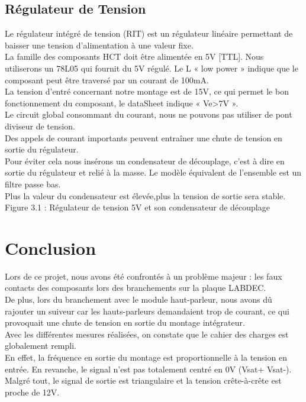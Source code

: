 {\section{Régulateur de Tension }


Le régulateur intégré de tension (RIT) est un régulateur linéaire permettant de baisser une tension d’alimentation à une valeur fixe.\\

La famille des composants HCT doit être alimentée en 5V [TTL]. Nous utiliserons un 78L05 qui fournit du 5V régulé. Le L « low power » indique que le composant peut être traversé par un courant de 100mA.\\
La tension d’entré concernant notre montage est de 15V, ce qui permet le bon fonctionnement du composant, le dataSheet indique « Ve>7V ».  \\

Le circuit global consommant du courant, nous ne pouvons pas utiliser de pont diviseur de tension.\\
 
Des appels de courant importants peuvent entraîner une chute de tension en sortie du régulateur. \\
Pour éviter cela nous insérons un condensateur de découplage, c’est à dire  en sortie du régulateur et relié à la masse. 
Le modèle équivalent de l’ensemble est un filtre passe bas.\\

Plus la valeur du condensateur est élevée,plus la tension de sortie sera stable.\\


 Figure 3.1 : Régulateur de tension 5V et son condensateur de découplage\chapter{Conclusion}

Lors de ce projet, nous avons été confrontés à un problème majeur : les faux contacts des composants lors des branchements sur la plaque LABDEC.\\

De plus, lors du branchement avec le module haut-parleur, nous avons dû rajouter un suiveur car les hauts-parleurs demandaient trop de courant, 
ce qui provoquait une chute de tension en sortie du montage intégrateur.\\

Avec les différentes mesures réalisées, on constate que le cahier des charges est globalement rempli.\\
En effet, la fréquence en sortie du montage est proportionnelle à la tension en entrée. En revanche, le signal n’est pas totalement centré en 0V (Vsat+ Vsat-). 
Malgré tout, le signal de sortie est triangulaire et la tension crête-à-crête est proche de 12V.\\




}
